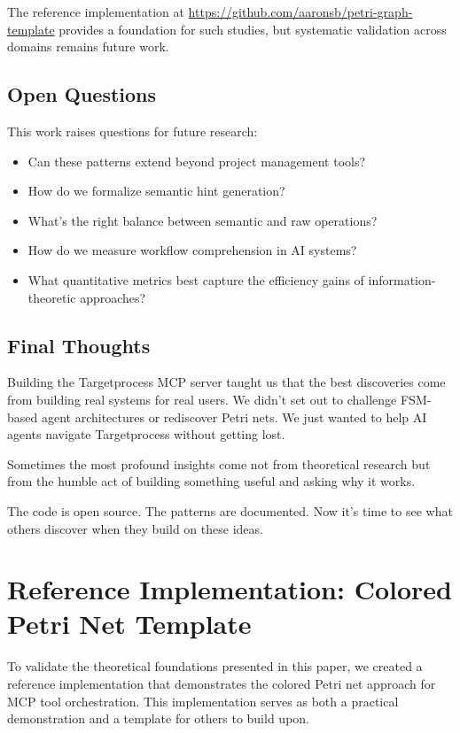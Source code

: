 \documentclass[11pt,a4paper]{article}
\begin{document}
The reference implementation at \url{https://github.com/aaronsb/petri-graph-template} provides a foundation for such studies, but systematic validation across domains remains future work.

\subsection{Open Questions}

This work raises questions for future research:
\begin{itemize}
\item Can these patterns extend beyond project management tools?
\item How do we formalize semantic hint generation?
\item What's the right balance between semantic and raw operations?
\item How do we measure workflow comprehension in AI systems?
\item What quantitative metrics best capture the efficiency gains of information-theoretic approaches?
\end{itemize}

\subsection{Final Thoughts}

Building the Targetprocess MCP server taught us that the best discoveries come from building real systems for real users. We didn't set out to challenge FSM-based agent architectures or rediscover Petri nets. We just wanted to help AI agents navigate Targetprocess without getting lost.

Sometimes the most profound insights come not from theoretical research but from the humble act of building something useful and asking why it works.

The code is open source. The patterns are documented. Now it's time to see what others discover when they build on these ideas.

\section{Reference Implementation: Colored Petri Net Template}

To validate the theoretical foundations presented in this paper, we created a reference implementation that demonstrates the colored Petri net approach for MCP tool orchestration. This implementation serves as both a practical demonstration and a template for others to build upon.
\end{document}
